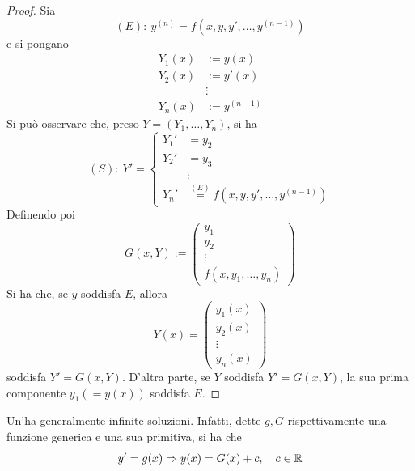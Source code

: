 \begin{proof}
    Sia
    \begin{equation}
  (E):\ y^{(n)}=f\left(x, y, y', \dots, y^{(n-1)}\right)
    \end{equation}
    e si pongano
    \begin{equation}
        \begin{aligned}
            Y_1(x)&:=y(x)\\
            Y_2(x)&:=y'(x)\\
            &\vdots\\
            Y_n(x)&:=y^{(n-1)}
        \end{aligned}
    \end{equation}
    Si può osservare che, preso $Y=(Y_1, \dots, Y_n)$, si ha
    \begin{equation}
      (S):\ Y'= \begin{cases}
            Y_1'&= y_2\\
            Y_2'&=y_3\\
            &\vdots\\
            Y_n'&\overset{(E)}{=}f\left(x, y, y', \dots, y^{(n-1)}\right)
        \end{cases}
    \end{equation}
    Definendo poi
    \begin{equation}
        G(x, Y) := \begin{pmatrix}
            y_1\\
            y_2\\
            \vdots\\
            f(x, y_1, \dots, y_n)
        \end{pmatrix}
    \end{equation}
    Si ha che, se $y$ soddisfa $E$, allora 
    \begin{equation}
        Y(x)=\begin{pmatrix}
            y_1(x)\\
            y_2(x)\\
            \vdots\\
            y_n(x)
        \end{pmatrix}
    \end{equation}
    soddisfa $Y'=G(x, Y)$. D'altra parte, se $Y$ soddisfa $Y'=G(x, Y)$, la sua prima componente $y_1(=y(x))$ soddisfa $E$.
\end{proof}
\begin{oss}
Un'\ode ha generalmente infinite soluzioni. Infatti, dette $g, G$ rispettivamente una funzione generica e una sua primitiva, si ha che
\begin{equation}
    y'= g(x) \Rightarrow y(x)= G(x)+c,\quad c \in \mathbb{R}
\end{equation}
\end{oss}

